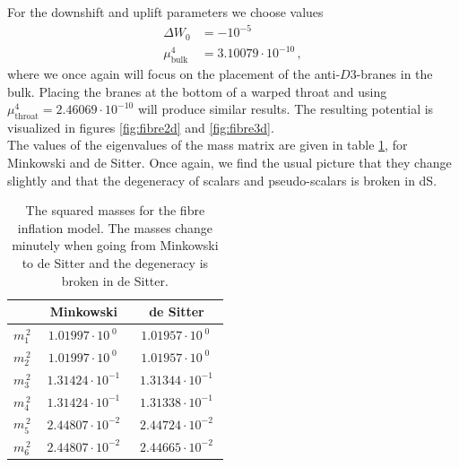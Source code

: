 \documentclass[a4paper,12pt]{report}
\newcommand{\bea}{\begin{equation}\begin{aligned}}
\newcommand{\eea}{\end{aligned}\end{equation}}
\begin{document}
For the downshift and uplift parameters we choose values
\bea
\Delta W_0 &= - 10^{-5}\\
\mu^4_{\text{bulk}} &= 3.10079 \cdot 10^{-10}\,,
\eea
where we once again will focus on the placement of the anti-$D3$-branes in the bulk. Placing the branes at the bottom of a warped throat and using $\mu^4_{\text{throat}} = 2.46069 \cdot 10^{-10}$ will produce similar results. The resulting potential is visualized in figures \ref{fig:fibre2d} and \ref{fig:fibre3d}.\\
The values of the eigenvalues of the mass matrix are given in table \ref{tab:fibremass}, for Minkowski and de Sitter. Once again, we find the usual picture that they change slightly and that the degeneracy of scalars and pseudo-scalars is broken in dS.
\begin{table}[H]
\centering
\begin{tabular}{|c|c|c|}\hline
&  Minkowski  & de Sitter \\\hline
$m_1^{\,2}$ & $\; 1.01997 \cdot 10^{\;0} \,\;$ & $\; 1.01957 \cdot 10^{\;0} \,\;$\\\hline
$m_2^{\,2}$ & $\; 1.01997 \cdot 10^{\;0} \,\;$ & $\; 1.01957\cdot 10^{\;0}  \,\;$\\\hline
$m_3^{\,2}$ & $\; 1.31424 \cdot 10^{-1} \;$ & $\; 1.31344 \cdot 10^{-1} \;$\\\hline
$m_4^{\,2}$ & $\; 1.31424 \cdot 10^{-1} \;$ & $\; 1.31338 \cdot 10^{-1} \;$\\\hline
$m_5^{\,2}$ & $\; 2.44807 \cdot 10^{-2} \;$ & $\; 2.44724 \cdot 10^{-2} \;$\\\hline
$m_6^{\,2}$ & $\; 2.44807 \cdot 10^{-2} \;$ & $\; 2.44665 \cdot 10^{-2} \;$\\\hline
\end{tabular}
\caption{The squared masses for the fibre inflation model. The masses change minutely when going from Minkowski to de Sitter and the degeneracy is broken in de Sitter.}
\label{tab:fibremass}
\end{table}
\end{document}
